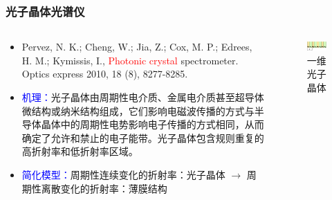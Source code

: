 \begin{frame}[c]
    \frametitle{光子晶体光谱仪}
    \begin{columns}
        \begin{column}{.7\textwidth}
            \begin{itemize}
                \item Pervez, N. K.;  Cheng, W.;  Jia, Z.;  Cox, M. P.;  Edrees, H. M.; Kymissis, I., \textcolor{red}{Photonic crystal} spectrometer. Optics express 2010, 18 (8), 8277-8285.
                \item \textcolor{blue}{机理：}光子晶体由周期性电介质、金属电介质甚至超导体微结构或纳米结构组成，它们影响电磁波传播的方式与半导体晶体中的周期性电势影响电子传播的方式相同，从而确定了允许和禁止的电子能带。光子晶体包含规则重复的高折射率和低折射率区域。
                \item \textcolor{blue}{简化模型：}周期性连续变化的折射率：光子晶体 $\rightarrow$ 周期性离散变化的折射率：薄膜结构
            \end{itemize}
        \end{column}
        \begin{column}{.3\textwidth}
            \begin{figure}[H] %
                \centering %
                \includegraphics[width=1.\textwidth]{figures/Photonic crystal spectrometer_4.png} %
                \caption{一维光子晶体} %
            \end{figure}
            \begin{figure}[H] %
                \centering %

\end{figure}
\end{column}
\end{columns}
\end{frame}
